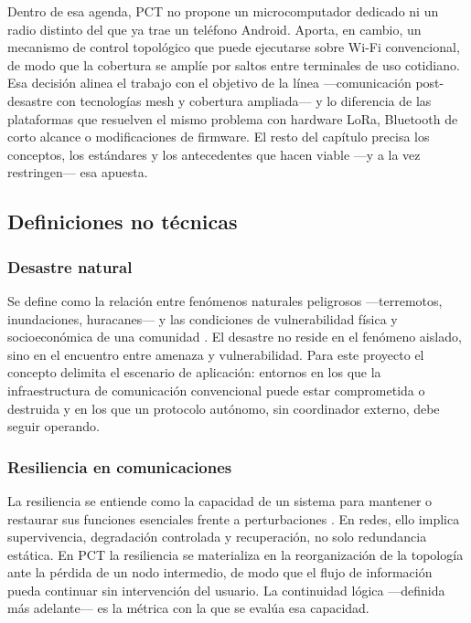 \documentclass[12pt,oneside]{scrreprt}
\begin{document}
Dentro de esa agenda, PCT no propone un microcomputador dedicado ni un radio distinto del que ya trae un teléfono Android. Aporta, en cambio, un mecanismo de control topológico que puede ejecutarse sobre Wi-Fi convencional, de modo que la cobertura se amplíe por saltos entre terminales de uso cotidiano. Esa decisión alinea el trabajo con el objetivo de la línea ---comunicación post-desastre con tecnologías mesh y cobertura ampliada--- y lo diferencia de las plataformas que resuelven el mismo problema con hardware LoRa, Bluetooth de corto alcance o modificaciones de firmware. El resto del capítulo precisa los conceptos, los estándares y los antecedentes que hacen viable ---y a la vez restringen--- esa apuesta.

\subsection{Definiciones no técnicas}
\label{sec:definiciones-no-tecnicas}

\subsubsection{Desastre natural}

Se define como la relación entre fenómenos naturales peligrosos ---terremotos, inundaciones, huracanes--- y las condiciones de vulnerabilidad física y socioeconómica de una comunidad \parencite[pp.~6--9]{Maskrey1993}. El desastre no reside en el fenómeno aislado, sino en el encuentro entre amenaza y vulnerabilidad. Para este proyecto el concepto delimita el escenario de aplicación: entornos en los que la infraestructura de comunicación convencional puede estar comprometida o destruida y en los que un protocolo autónomo, sin coordinador externo, debe seguir operando.

\subsubsection{Resiliencia en comunicaciones}

La resiliencia se entiende como la capacidad de un sistema para mantener o restaurar sus funciones esenciales frente a perturbaciones \parencite{Sterbenz2010}. En redes, ello implica supervivencia, degradación controlada y recuperación, no solo redundancia estática. En PCT la resiliencia se materializa en la reorganización de la topología ante la pérdida de un nodo intermedio, de modo que el flujo de información pueda continuar sin intervención del usuario. La continuidad lógica ---definida más adelante--- es la métrica con la que se evalúa esa capacidad.
\end{document}
